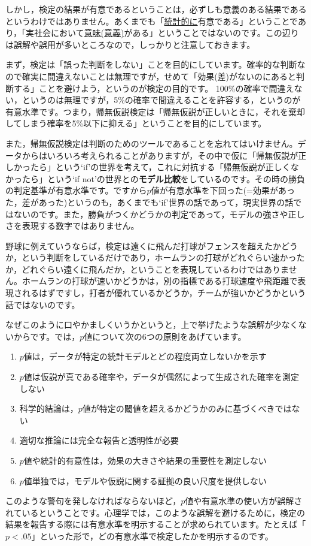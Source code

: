 \documentclass{ltjsbook}
\begin{document}
しかし，検定の結果が有意であるということは，必ずしも意義のある結果であるというわけではありません。あくまでも「\underline{統計的に}有意である」ということであり，「実社会において\underline{意味(意義)}がある」ということではないのです。この辺りは誤解や誤用が多いところなので，しっかりと注意しておきます。

まず，検定は「誤った判断をしない」ことを目的にしています。確率的な判断なので確実に間違えないことは無理ですが，せめて「効果(差)がないのにあると判断する」ことを避けよう，というのが検定の目的です。
100\%の確率で間違えない，というのは無理ですが，5\%の確率で間違えることを許容する，というのが有意水準です。つまり，帰無仮説検定は「帰無仮説が正しいときに，それを棄却してしまう確率を5\%以下に抑える」ということを目的にしています。

また，帰無仮説検定は判断のためのツールであることを忘れてはいけません。データからはいろいろ考えられることがありますが，その中で仮に「帰無仮説が正しかったら」という`if'の世界を考えて，これに対抗する「帰無仮説が正しくなかったら」という`if not'の世界との\textbf{モデル比較}をしているのです。その時の勝負の判定基準が有意水準です。ですから$p$値が有意水準を下回った(=効果があった，差があった)というのも，あくまでも`if'世界の話であって，現実世界の話ではないのです。また，勝負がつくかどうかの判定であって，モデルの強さや正しさを表現する数字ではありません。

野球に例えていうならば，検定は遠くに飛んだ打球がフェンスを超えたかどうか，という判断をしているだけであり，ホームランの打球がどれぐらい速かったか，どれぐらい遠くに飛んだか，ということを表現しているわけではありません。ホームランの打球が速いかどうかは，別の指標である打球速度や飛距離で表現されるはずですし，打者が優れているかどうか，チームが強いかどうかという話ではないのです。

なぜこのように口やかましくいうかというと，上で挙げたような誤解が少なくないからです。\textcite{Wasserstein2016}では，$p$値について次の6つの原則をあげています。
\begin{enumerate}
	\item $p$値は，データが特定の統計モデルとどの程度両立しないかを示す
	\item $p$値は仮説が真である確率や，データが偶然によって生成された確率を測定しない
	\item 科学的結論は，$p$値が特定の閾値を超えるかどうかのみに基づくべきではない
	\item 適切な推論には完全な報告と透明性が必要
	\item $p$値や統計的有意性は，効果の大きさや結果の重要性を測定しない
	\item $p$値単独では，モデルや仮説に関する証拠の良い尺度を提供しない
\end{enumerate}
このような警句を発しなければならないほど，$p$値や有意水準の使い方が誤解されているということです。心理学では，このような誤解を避けるために，検定の結果を報告する際には有意水準を明示することが求められています。たとえば「$p<.05$」といった形で，どの有意水準で検定したかを明示するのです。
\end{document}
